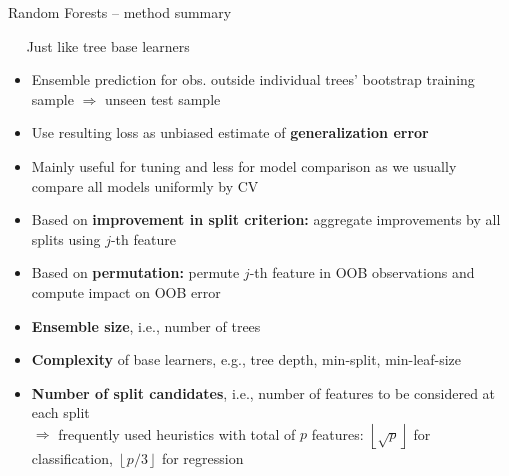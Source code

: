 \begin{frame}{Random Forests -- method summary}

 ~~ Just like tree base learners

\medskip

\begin{itemize}
  \item Ensemble prediction for obs. outside individual trees' bootstrap training sample $\Rightarrow$ unseen test sample
  \item Use resulting loss as unbiased estimate of \textbf{generalization error}
  \item Mainly useful for tuning and less for model comparison as we usually compare all models uniformly by CV
\end{itemize}

\medskip


\begin{itemize}
  \item Based on \textbf{improvement in split criterion:} aggregate improvements 
  by all splits using $j$-th feature
  \item Based on \textbf{permutation:} permute $j$-th feature in 
  OOB observations and compute impact on OOB error
\end{itemize}

\medskip


\begin{itemize}
  \item \textbf{Ensemble size}, i.e., number of trees
  \item \textbf{Complexity} of base learners, e.g., tree depth, min-split, min-leaf-size
  \item \textbf{Number of split candidates}, i.e., number of features to be considered at each split \\
  $\Rightarrow$ frequently used heuristics with total of $p$ features: 
  $\left \lfloor{\sqrt{p}}\right \rfloor$ for classification, $\left \lfloor{p/3}\right \rfloor$ for regression
\end{itemize}

  
\end{frame}


